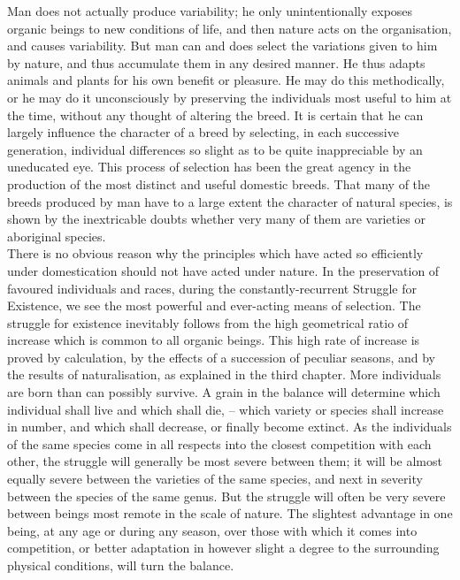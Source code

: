 \indent Man does not actually produce variability; he only unintentionally exposes organic beings to new conditions of life, and then nature acts on the organisation, and causes variability. But man can and does select the variations given to him by nature, and thus accumulate them in any desired manner. He thus adapts animals and plants for his own benefit or pleasure. He may do this methodically, or he may do it unconsciously by preserving the individuals most useful to him at the time, without any thought of altering the breed. It is certain that he can largely influence the character of a breed by selecting, in each successive generation, individual differences so slight as to be quite inappreciable by an uneducated eye. This process of selection has been the great agency in the production of the most distinct and useful domestic breeds. That many of the breeds produced by man have to a large extent the character of natural species, is shown by the inextricable doubts whether very many of them are varieties or aboriginal species.~\\
\indent There is no obvious reason why the principles which have acted so efficiently under domestication should not have acted under nature. In the preservation of favoured individuals and races, during the constantly-recurrent Struggle for Existence, we see the most powerful and ever-acting means of selection. The struggle for existence inevitably follows from the high geometrical ratio of increase which is common to all organic beings. This high rate of increase is proved by calculation, by the effects of a succession of peculiar seasons, and by the results of naturalisation, as explained in the third chapter. More individuals are born than can possibly survive. A grain in the balance will determine which individual shall live and which shall die, -- which variety or species shall increase in number, and which shall decrease, or finally become extinct. As the individuals of the same species come in all respects into the closest competition with each other, the struggle will generally be most severe between them; it will be almost equally severe between the varieties of the same species, and next in severity between the species of the same genus. But the struggle will often be very severe between beings most remote in the scale of nature. The slightest advantage in one being, at any age or during any season, over those with which it comes into competition, or better adaptation in however slight a degree to the surrounding physical conditions, will turn the balance.~\\

